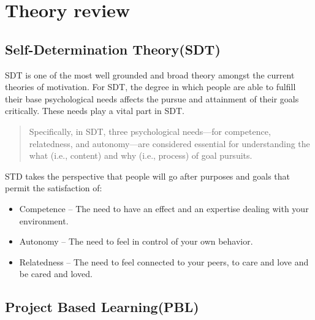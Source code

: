 \section{Theory review}

\subsection{Self-Determination Theory(SDT)}

SDT is one of the most well grounded
\cite{motivation:handbook_self_determination} and broad theory amongst the
current theories of motivation. For SDT, the degree in which people are able to
fulfill their base psychological needs affects the pursue and attainment of
their goals critically. These needs play a vital part in SDT.

\begin{quote}
    Specifically, in SDT, three psychological needs—for competence, relatedness, and
    autonomy—are considered essential for understanding the what (i.e., content) and
    why (i.e., process) of goal pursuits. \cite{motivation:ryan_deci__what_and_why} 
\end{quote}

STD takes the perspective that people will go after purposes and goals that
permit the satisfaction of: \cite{motivation:ryan_deci__what_and_why} 

\begin{itemize}
    \item Competence -- The need to have an effect and an expertise dealing with
    your environment.
    \item Autonomy -- The need to feel in control of your own behavior.
    \item Relatedness -- The need to feel connected to your peers, to care and
    love and be cared and loved.
\end{itemize} 

\subsection{Project Based Learning(PBL)}
